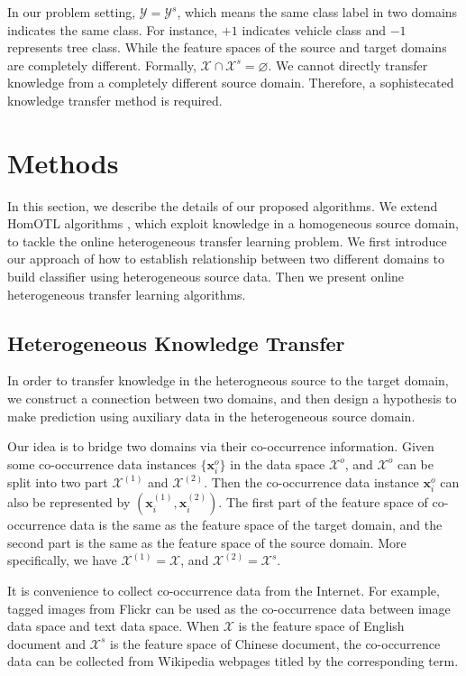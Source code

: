 \documentclass[letterpaper]{article}
\theoremstyle{remark}
\theoremstyle{definition}
\begin{document}
In our problem setting, $\mathcal{Y} = \mathcal{Y}^{s}$, which means the same class label in two domains indicates the same class.
For instance, $+1$ indicates vehicle class and $-1$ represents tree class.
While the feature spaces of the source and target domains are completely different.
Formally, $\mathcal{X} \cap \mathcal{X}^{s} = \varnothing$.
We cannot directly transfer knowledge from a completely different source domain.
Therefore, a sophistecated knowledge transfer method is required.

\section{Methods}

In this section, we describe the details of our proposed algorithms.
We extend HomOTL algorithms \cite{zhao2014online}, which exploit knowledge in a homogeneous source domain, to tackle the online heterogeneous transfer learning problem.
We first introduce our approach of how to establish relationship between two different domains to build classifier using heterogeneous source data.
Then we present online heterogeneous transfer learning algorithms.

\subsection{Heterogeneous Knowledge Transfer}

In order to transfer knowledge in the heterogneous source to the target domain, we construct a connection between two domains, and then design a hypothesis to make prediction using auxiliary data in the heterogeneous source domain.

Our idea is to bridge two domains via their co-occurrence information.
Given some co-occurrence data instances $\{ \mathbf{x}_{i}^{o} \}$ in the data space $\mathcal{X}^o$, and $\mathcal{X}^o$ can be split into two part $\mathcal{X}^{(1)}$ and $\mathcal{X}^{(2)}$.
Then the co-occurrence data instance $\mathbf{x}_{i}^{o}$ can also be represented by $(\mathbf{x}_{i}^{(1)}, \mathbf{x}_{i}^{(2)})$.
The first part of the feature space of co-occurrence data is the same as the feature space of the target domain, and the second part is the same as the feature space of the source domain.
More specifically, we have $\mathcal{X}^{(1)} = \mathcal{X}$, and $\mathcal{X}^{(2)} = \mathcal{X}^s$.

It is convenience to collect co-occurrence data from the Internet.
For example, tagged images from Flickr can be used as the co-occurrence data between image data space and text data space.
When $\mathcal{X}$ is the feature space of English document and $\mathcal{X}^s$ is the feature space of Chinese document, the co-occurrence data can be collected from Wikipedia webpages titled by the corresponding term.
\end{document}
